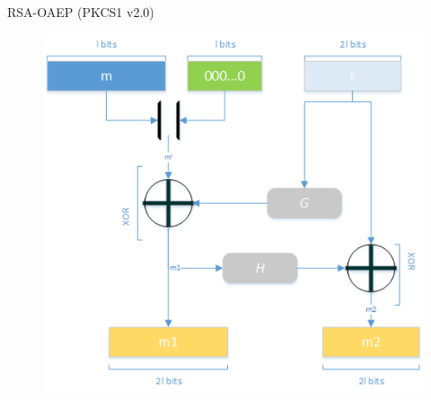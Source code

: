 \documentclass[handout]{beamer}
\begin{document}
\begin{frame}[allowframebreaks]{RSA-OAEP (PKCS1 v2.0)}
\framebreak 

\begin{figure}
\includegraphics[scale=0.6]{oaep.png}  
\end{figure}

\end{frame}
\end{document}
